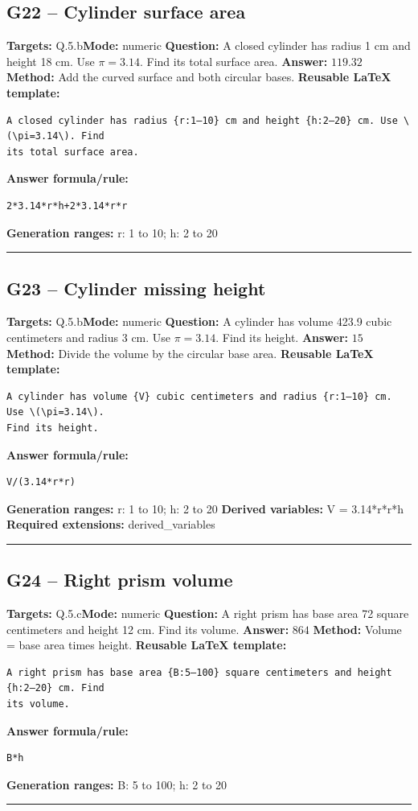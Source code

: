 \documentclass[11pt]{article}
\begin{document}
\subsection{G22 -- Cylinder surface area}
\textbf{Targets:} Q.5.b\quad\textbf{Mode:} numeric
\textbf{Question:} A closed cylinder has radius 1 cm and height 18 cm. Use \(\pi=3.14\). Find its total surface area.
\textbf{Answer:} \(119.32\)
\textbf{Method:} Add the curved surface and both circular bases.
\textbf{Reusable LaTeX template:}
\begin{verbatim}
A closed cylinder has radius {r:1–10} cm and height {h:2–20} cm. Use \(\pi=3.14\). Find
its total surface area.
\end{verbatim}
\textbf{Answer formula/rule:}
\begin{verbatim}
2*3.14*r*h+2*3.14*r*r
\end{verbatim}
\textbf{Generation ranges:} r: 1 to 10; h: 2 to 20
\medskip\hrule\medskip
\subsection{G23 -- Cylinder missing height}
\textbf{Targets:} Q.5.b\quad\textbf{Mode:} numeric
\textbf{Question:} A cylinder has volume 423.9 cubic centimeters and radius 3 cm. Use \(\pi=3.14\). Find its height.
\textbf{Answer:} \(15\)
\textbf{Method:} Divide the volume by the circular base area.
\textbf{Reusable LaTeX template:}
\begin{verbatim}
A cylinder has volume {V} cubic centimeters and radius {r:1–10} cm. Use \(\pi=3.14\).
Find its height.
\end{verbatim}
\textbf{Answer formula/rule:}
\begin{verbatim}
V/(3.14*r*r)
\end{verbatim}
\textbf{Generation ranges:} r: 1 to 10; h: 2 to 20
\textbf{Derived variables:} V = 3.14*r*r*h
\textbf{Required extensions:} derived\_variables
\medskip\hrule\medskip
\subsection{G24 -- Right prism volume}
\textbf{Targets:} Q.5.c\quad\textbf{Mode:} numeric
\textbf{Question:} A right prism has base area 72 square centimeters and height 12 cm. Find its volume.
\textbf{Answer:} \(864\)
\textbf{Method:} Volume = base area times height.
\textbf{Reusable LaTeX template:}
\begin{verbatim}
A right prism has base area {B:5–100} square centimeters and height {h:2–20} cm. Find
its volume.
\end{verbatim}
\textbf{Answer formula/rule:}
\begin{verbatim}
B*h
\end{verbatim}
\textbf{Generation ranges:} B: 5 to 100; h: 2 to 20
\medskip\hrule\medskip
\end{document}
